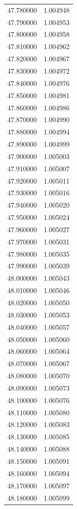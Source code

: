 \begin{tabular}{rr}
47.780000 & 1.004948 \\
47.790000 & 1.004953 \\
47.800000 & 1.004958 \\
47.810000 & 1.004962 \\
47.820000 & 1.004967 \\
47.830000 & 1.004972 \\
47.840000 & 1.004976 \\
47.850000 & 1.004981 \\
47.860000 & 1.004986 \\
47.870000 & 1.004990 \\
47.880000 & 1.004994 \\
47.890000 & 1.004999 \\
47.900000 & 1.005003 \\
47.910000 & 1.005007 \\
47.920000 & 1.005011 \\
47.930000 & 1.005016 \\
47.940000 & 1.005020 \\
47.950000 & 1.005024 \\
47.960000 & 1.005027 \\
47.970000 & 1.005031 \\
47.980000 & 1.005035 \\
47.990000 & 1.005039 \\
48.000000 & 1.005043 \\
48.010000 & 1.005046 \\
48.020000 & 1.005050 \\
48.030000 & 1.005053 \\
48.040000 & 1.005057 \\
48.050000 & 1.005060 \\
48.060000 & 1.005064 \\
48.070000 & 1.005067 \\
48.080000 & 1.005070 \\
48.090000 & 1.005073 \\
48.100000 & 1.005076 \\
48.110000 & 1.005080 \\
48.120000 & 1.005083 \\
48.130000 & 1.005085 \\
48.140000 & 1.005088 \\
48.150000 & 1.005091 \\
48.160000 & 1.005094 \\
48.170000 & 1.005097 \\
48.180000 & 1.005099 \\

\end{tabular}
